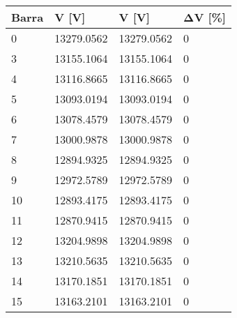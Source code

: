 \begin{tabular}{llll}
\toprule
\textbf{Barra}&\textbf{V [V]}&\textbf{V [V]}&\textbf{$\mathbf{\Delta}$V [\%]}\\
\midrule
0&13279.0562&13279.0562&0\\
3&13155.1064&13155.1064&0\\
4&13116.8665&13116.8665&0\\
5&13093.0194&13093.0194&0\\
6&13078.4579&13078.4579&0\\
7&13000.9878&13000.9878&0\\
8&12894.9325&12894.9325&0\\
9&12972.5789&12972.5789&0\\
10&12893.4175&12893.4175&0\\
11&12870.9415&12870.9415&0\\
12&13204.9898&13204.9898&0\\
13&13210.5635&13210.5635&0\\
14&13170.1851&13170.1851&0\\
15&13163.2101&13163.2101&0\\
\bottomrule
\end{tabular}

